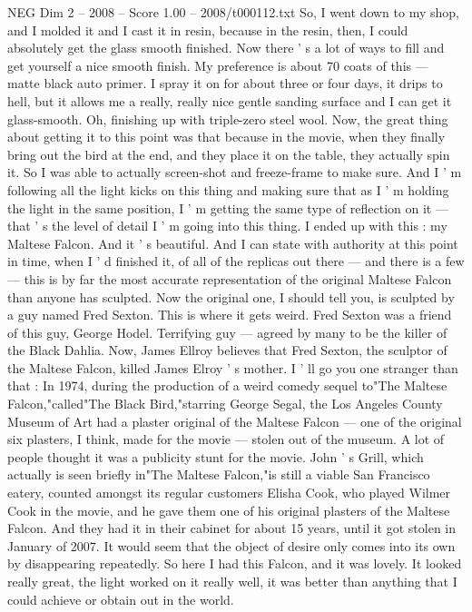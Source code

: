 \begin{textsample}{NEG Dim 2 – 2008 – Score 1.00 – 2008/t000112.txt}
So, I went down to my shop, and I molded it and I cast it in resin, because in the resin, then, I could absolutely get the glass smooth finished.
Now there ' s a lot of ways to fill and get yourself a nice smooth finish.
My preference is about 70 coats of this — matte black auto primer.
I spray it on for about three or four days, it drips to hell, but it allows me a really, really nice gentle sanding surface and I can get it glass-smooth.
Oh, finishing up with triple-zero steel wool.
Now, the great thing about getting it to this point was that because in the movie, when they finally bring out the bird at the end, and they place it on the table, they actually spin it.
So I was able to actually screen-shot and freeze-frame to make sure.
And I ' m following all the light kicks on this thing and making sure that as I ' m holding the light in the same position, I ' m getting the same type of reflection on it — that ' s the level of detail I ' m going into this thing.
I ended up with this : my Maltese Falcon.
And it ' s beautiful.
And I can state with authority at this point in time, when I ' d finished it, of all of the replicas out there — and there is a few — this is by far the most accurate representation of the original Maltese Falcon than anyone has sculpted.
Now the original one, I should tell you, is sculpted by a guy named Fred Sexton.
This is where it gets weird.
Fred Sexton was a friend of this guy, George Hodel.
Terrifying guy — agreed by many to be the killer of the Black Dahlia.
Now, James Ellroy believes that Fred Sexton, the sculptor of the Maltese Falcon, killed James Elroy ' s mother.
I ' ll go you one stranger than that : In 1974, during the production of a weird comedy sequel to"The Maltese Falcon,"called"The Black Bird,"starring George Segal, the Los Angeles County Museum of Art had a plaster original of the Maltese Falcon — one of the original six plasters, I think, made for the movie — stolen out of the museum.
A lot of people thought it was a publicity stunt for the movie.
John ' s Grill, which actually is seen briefly in"The Maltese Falcon,"is still a viable San Francisco eatery, counted amongst its regular customers Elisha Cook, who played Wilmer Cook in the movie, and he gave them one of his original plasters of the Maltese Falcon.
And they had it in their cabinet for about 15 years, until it got stolen in January of 2007.
It would seem that the object of desire only comes into its own by disappearing repeatedly.
So here I had this Falcon, and it was lovely.
It looked really great, the light worked on it really well, it was better than anything that I could achieve or obtain out in the world.

\end{textsample}
